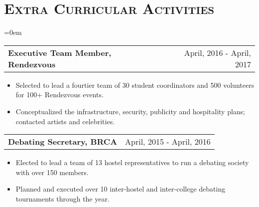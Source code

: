 \documentclass{article}
\makeatletter
\newcommand{\headerrow}[2]
{\begin{tabular*}{\linewidth}{l@{\extracolsep{\fill}}r}
	#1 &
	#2 \\
\end{tabular*}}
\newcommand{\tmpsection}[1]{}
\let\tmpsection=\section
\renewcommand{\section}[1]{\tmpsection*{\textsc{#1}}}
\makeatother
\begin{document}
\section{Extra Curricular Activities}

\begin{list} {}{\leftmargin=0em}
\setlength{\leftmargin}{0pt}
\item[]
  \headerrow
    {\textbf{Executive Team Member, Rendezvous}}
    {April, 2016 - April, 2017}
      \begin{itemize}
        \item Selected to lead a fourtier team of 30 student coordinators and 500 volunteers for 100+ Rendezvous events.
        \item Conceptualized the infrastructure, security, publicity and hospitality plans; contacted artists and celebrities.
      \end{itemize}

\item[]
  \headerrow
    {\textbf{Debating Secretary, BRCA}}
    {April, 2015 - April, 2016}
      \begin{itemize}
        \item Elected to lead a team of 13 hostel representatives to run a debating society with over 150 members.
        \item Planned and executed over 10 inter-hostel and inter-college debating tournaments through the year.
      \end{itemize}

\end{list}
\end{document}
